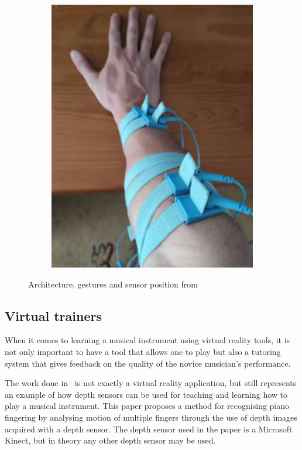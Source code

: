 \begin{figure}[ht]
\begin{subfigure}{0.32\textwidth}
	\end{subfigure}
	\hfill
	\begin{subfigure}{0.32\textwidth}
		\centering
		\includegraphics[width=\textwidth]{images/related-work/emg-sensors}
	\end{subfigure}
	\caption{Architecture, gestures and sensor position from~\protect\cite{emg-midi-controller}}
	\label{fig:emg-controller}
\end{figure}

\subsection{Virtual trainers}\label{subsec:virtual-trainers}
When it comes to learning a musical instrument using virtual reality tools,
it is not only important to have a tool that allows one to play
but also a tutoring system that gives feedback on the quality of the novice musician's performance.

The work done in~\cite{piano-fingering-recognition} is not exactly a virtual reality application, but still
represents an example of how depth sensors can be used for teaching and learning how to play a musical instrument.
This paper proposes a method for recognising piano fingering by analysing motion of multiple fingers through the use
of depth images acquired with a depth sensor.
The depth sensor used in the paper is a Microsoft Kinect, but in theory any other depth sensor may be used.


